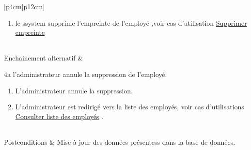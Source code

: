 \begin{longtable}{|p{4cm}|p{12cm}|}
\begin{minipage}[t]{\linewidth}
\begin{enumerate}[itemindent=0pt, leftmargin=*, nosep,before=\vspace{-0.5\baselineskip},after=\vspace{0.2\baselineskip}]
                                \item le ssystem supprime l'empreinte de l'employé ,voir cas d'utilisation \underline{Supprimer empreinte}
                            \end{enumerate}
                    \end{minipage}
                    \\
                    \hline
                    Enchainement alternatif & 
                    \begin{minipage}[t]{\linewidth}
                            4a l’administrateur annule la suppression de l'employé. \begin{enumerate}[nosep,after=\strut]
                                \item L’administrateur annule la suppression.
                                \item L’administrateur est redirigé vers la liste des employés, voir cas d’utilisations \underline{Consulter liste des employés} .
                            \end{enumerate}
                    \end{minipage}
                    \\
                    
                    \hline
                    Postconditions & Mise à jour des données présentess dans la base de données.
                    \\
                    \hline
                    \caption{Description du cas d'utilisation « Supprimer un employé »}\\
            \end{longtable}
        
